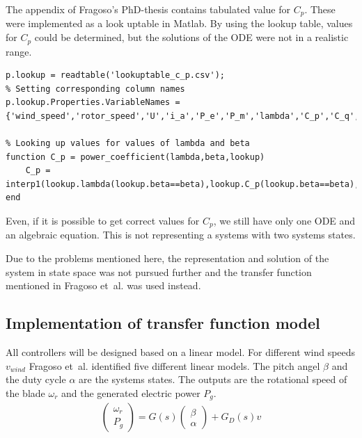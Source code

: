 The appendix of Fragoso's PhD-thesis contains tabulated value for $C_p$.
These were implemented as a look uptable in Matlab.
By using the lookup table, values for $C_p$ could be determined, but the solutions of the ODE were not in a realistic range.

\begin{lstlisting}[style=Matlab-editor,caption={Matlab function for look uptable. With this function we can get a corresponding $C_p$ value for given $\beta$ and $\lambda$. The \texttt{.csv}-file can be found in the GitHub repository},captionpos=b,label={list:analysis:lookup}]
% Loading tabulated values as .csv file
p.lookup = readtable('lookuptable_c_p.csv');
% Setting corresponding column names 
p.lookup.Properties.VariableNames = {'wind_speed','rotor_speed','U','i_a','P_e','P_m','lambda','C_p','C_q','beta'};

% Looking up values for values of lambda and beta
function C_p = power_coefficient(lambda,beta,lookup)
    C_p = interp1(lookup.lambda(lookup.beta==beta),lookup.C_p(lookup.beta==beta),lambda);
end
\end{lstlisting}

Even, if it is possible to get correct values for $C_p$, we still have only one ODE and an algebraic equation.
This is not representing a systems with two systems states.

Due to the problems mentioned here, the representation and solution of the system in state space was not pursued further and the transfer function mentioned in Fragoso et~al. was used instead.

\subsection{Implementation of transfer function model} \label{sec:analysis:tf}

All controllers will be designed based on a linear model.
For different wind speeds $v_{wind}$ Fragoso et~al. identified five different linear models.
The pitch angel $\beta$ and the duty cycle $\alpha$ are the systems states.
The outputs are the rotational speed of the blade $\omega_r$ and the generated electric power $P_g$.
\begin{align}
    \begin{pmatrix}
        \omega_r \\
        P_g
      \end{pmatrix} = 
      G(s) 
      \begin{pmatrix}
        \beta \\
        \alpha
      \end{pmatrix} + G_D(s) v
\end{align}

